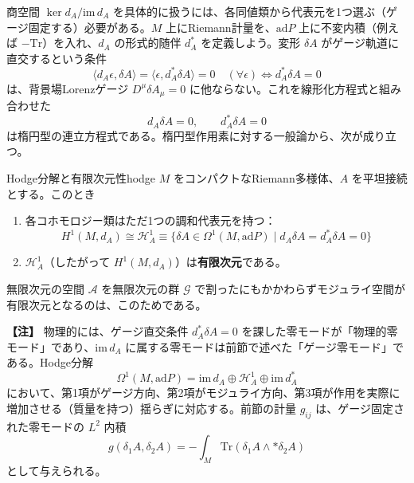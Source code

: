 \documentclass[uplatex, dvipdfmx, book]{jsbook}
\newenvironment{note}{\vspace{1ex}\par\footnotesize\noindent\textbf{【注】}}{\par\vspace{1ex}}
\begin{document}
商空間 $\ker d_A / \mathrm{im}\, d_A$ を具体的に扱うには、各同値類から代表元を1つ選ぶ（ゲージ固定する）必要がある。$M$ 上にRiemann計量を、$\mathrm{ad}P$ 上に不変内積（例えば $-\mathrm{Tr}$）を入れ、$d_A$ の形式的随伴 $d_A^*$ を定義しよう。変形 $\delta A$ がゲージ軌道に直交するという条件
\begin{equation}
    \langle d_A \epsilon, \delta A \rangle = \langle \epsilon, d_A^* \delta A \rangle = 0 \quad (\forall \epsilon) \iff d_A^* \delta A = 0
\end{equation}
は、背景場Lorenzゲージ $D^\mu \delta A_\mu = 0$ に他ならない。これを線形化方程式と組み合わせた
\begin{equation}
    d_A \delta A = 0, \qquad d_A^* \delta A = 0
\end{equation}
は楕円型の連立方程式である。楕円型作用素に対する一般論から、次が成り立つ。

\begin{mythm}{Hodge分解と有限次元性}{hodge}
$M$ をコンパクトなRiemann多様体、$A$ を平坦接続とする。このとき
\begin{enumerate}
    \item 各コホモロジー類はただ1つの調和代表元を持つ：
    \begin{equation*}
        H^1(M, d_A) \cong \mathcal{H}^1_A \equiv \{ \delta A \in \Omega^1(M, \mathrm{ad}P) \mid d_A \delta A = d_A^* \delta A = 0 \}
    \end{equation*}
    \item $\mathcal{H}^1_A$（したがって $H^1(M, d_A)$）は\textbf{有限次元}である。
\end{enumerate}
\end{mythm}無限次元の空間 $\mathcal{A}$ を無限次元の群 $\mathcal{G}$ で割ったにもかかわらずモジュライ空間が有限次元となるのは、このためである。

\begin{note}
物理的には、ゲージ直交条件 $d_A^*\delta A = 0$ を課した零モードが「物理的零モード」であり、$\mathrm{im}\,d_A$ に属する零モードは前節で述べた「ゲージ零モード」である。Hodge分解
\begin{equation}
    \Omega^1(M, \mathrm{ad}P) = \mathrm{im}\, d_A \oplus \mathcal{H}^1_A \oplus \mathrm{im}\, d_A^*
\end{equation}
において、第1項がゲージ方向、第2項がモジュライ方向、第3項が作用を実際に増加させる（質量を持つ）揺らぎに対応する。前節の計量 $g_{ij}$ は、ゲージ固定された零モードの $L^2$ 内積
\begin{equation}
    g(\delta_1 A, \delta_2 A) = -\int_M \mathrm{Tr}(\delta_1 A \wedge * \delta_2 A)
\end{equation}
として与えられる。
\end{note}
\end{document}
